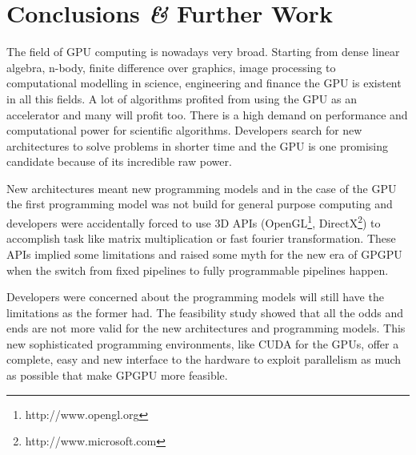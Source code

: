 \chapter{Conclusions \textit{\&} Further Work} %
\label{ch:further_work}







The field of \gls{GPU} computing is nowadays very broad. Starting from dense
linear algebra, n-body, finite difference over graphics, image processing to
computational modelling in science, engineering and finance the \gls{GPU} is
existent in all this fields. A lot of algorithms profited from using the
\gls{GPU} as an accelerator and many will profit too. There is a high demand on
performance and computational power for scientific algorithms. Developers search
for new architectures to solve problems in shorter time and the \gls{GPU} is one
promising candidate because of its incredible raw power. 

New architectures meant new programming models and in the case of the \gls{GPU}
the first programming model was not build for general purpose computing and
developers were accidentally forced to use \gls{3D} \glspl{API}
(OpenGL\footnote{http://www.opengl.org},
DirectX\footnote{http://www.microsoft.com}) to accomplish task like matrix
multiplication or fast fourier transformation. These \glspl{API} implied some
limitations and raised some myth for the new era of \gls{GPGPU} when the switch
from fixed pipelines to fully programmable pipelines happen. 

Developers were concerned about the programming models will still have the
limitations as the former had. The feasibility study showed that all the odds
and ends are not more valid for the new architectures and programming models.
This new sophisticated programming environments, like \gls{CUDA} for the
{} \glspl{GPU}, offer a complete, easy and new interface to
the hardware to exploit parallelism as much as possible that make \gls{GPGPU}
more feasible.

